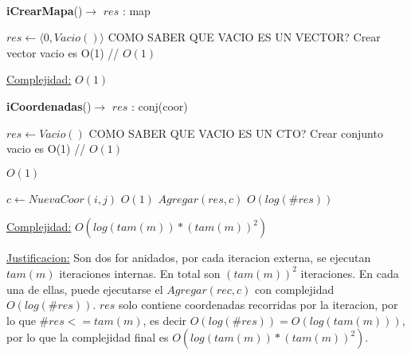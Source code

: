 $ $\newline
$ $\newline

\begin{Algoritmos}


\begin{algorithm}[H]
{\textbf{iCrearMapa}()$\to$ $res$ : map}
\begin{algorithmic}[1]
   
\State $res \gets  \langle 0 , Vacio() \rangle $     COMO SABER QUE VACIO ES UN VECTOR?  \Comment Crear vector vacio es O(1) // $O(1)$

\medskip
\Statex \underline{Complejidad:} $O(1)$

\end{algorithmic}
\end{algorithm}

\begin{algorithm}[H]
{\textbf{iCoordenadas}()$\to$ $res$ : conj(coor)}
\begin{algorithmic}[1]
   
 
\State $res \gets Vacio() $     COMO SABER QUE VACIO ES UN CTO?  \Comment Crear conjunto vacio es O(1) // $O(1)$

	
		
		  \Comment $O(1)$
			
			\State $c \gets NuevaCoor(i, j) $  \Comment $O(1)$			
			\State $Agregar(res, c) $  \Comment $O(log(\#res))$			
			
		\EndIf
		
	\EndFor

\EndFor


\medskip
\Statex \underline{Complejidad:} $O(log(tam(m))*(tam(m))^2)$

\Statex \underline{Justificacion:} Son dos for anidados, por cada iteracion externa, se ejecutan $tam(m)$ iteraciones internas. En total son $(tam(m))^2$ iteraciones. En cada una de ellas, puede ejecutarse el $Agregar(rec, c)$ con complejidad $O(log(\#res))$. $res$ solo contiene coordenadas recorridas por la iteracion, por lo que $\#res <= tam(m)$, es decir $O(log(\#res)) = O(log(tam(m)))$, por lo que la complejidad final es $O(log(tam(m))*(tam(m))^2)$.

\end{algorithmic}
\end{algorithm}


\end{Algoritmos}
